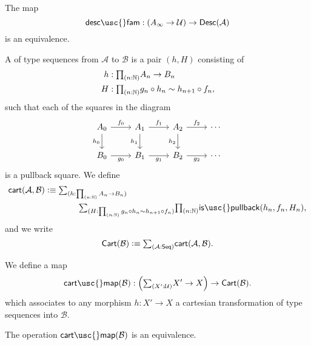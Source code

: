 \begin{thm}
The map 
\begin{equation*}
\mathsf{desc\usc{}fam} : (A_\infty\to\UU)\to\mathsf{Desc}(\mathcal{A})
\end{equation*}
is an equivalence.
\end{thm}

\begin{defn}
A  of type sequences from $\mathcal{A}$ to $\mathcal{B}$ is a pair $(h,H)$ consisting of
\begin{align*}
h & : \prd{n:\N} A_n\to B_n \\
H & : \prd{n:\N} g_n\circ h_n \htpy h_{n+1}\circ f_n,
\end{align*}
such that each of the squares in the diagram
\begin{equation*}
\begin{tikzcd}
A_0 \arrow[d,swap,"h_0"] \arrow[r,"f_0"] & A_1 \arrow[d,swap,"h_1"] \arrow[r,"f_1"] & A_2 \arrow[d,swap,"h_2"] \arrow[r,"f_2"] & \cdots \\
B_0 \arrow[r,swap,"g_0"] & B_1 \arrow[r,swap,"g_1"] & B_2 \arrow[r,swap,"g_2"] & \cdots
\end{tikzcd}
\end{equation*}
is a pullback square. We define
\begin{align*}
\mathsf{cart}(\mathcal{A},\mathcal{B}) & \defeq\sm{h:\prd{n:\N}A_n\to B_n} \\
& \qquad\qquad \sm{H:\prd{n:\N}g_n\circ h_n\htpy h_{n+1}\circ f_n}\prd{n:\N}\mathsf{is\usc{}pullback}(h_n,f_n,H_n),
\end{align*}
and we write
\begin{equation*}
\mathsf{Cart}(\mathcal{B}) \defeq \sm{\mathcal{A}:\mathsf{Seq}}\mathsf{cart}(\mathcal{A},\mathcal{B}).
\end{equation*}
\end{defn}

\begin{defn}
We define a map
\begin{equation*}
\mathsf{cart\usc{}map}(\mathcal{B}) : \Big(\sm{X':\UU}X'\to X\Big)\to\mathsf{Cart}(\mathcal{B}).
\end{equation*}
which associates to any morphism $h:X'\to X$ a cartesian transformation of type sequences into $\mathcal{B}$.
\end{defn}

\begin{thm}
The operation $\mathsf{cart\usc{}map}(\mathcal{B})$ is an equivalence.
\end{thm}


